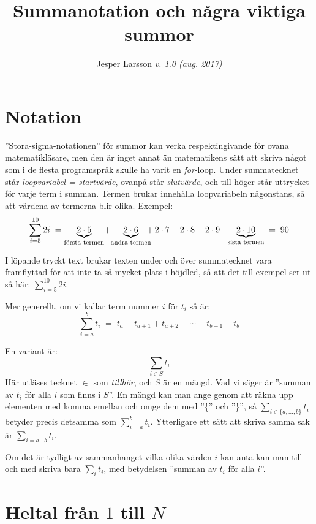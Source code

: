 \documentclass[a4paper]{article}
\author{Jesper Larsson \hspace*{.5em} \emph{v. 1.0 (aug. 2017)}}
\date{}
\title{Summanotation och några viktiga summor}
\begin{document}
\maketitle

\section*{Notation}
\label{sec:orgf287084}

”Stora-sigma-notationen” för summor kan verka respektingivande för ovana matematikläsare, men den är inget
annat än matematikens sätt att skriva något som i de flesta programspråk skulle ha
varit en \emph{for}-loop. Under summatecknet står \emph{loopvariabel = startvärde},
ovanpå står \emph{slutvärde}, och till höger står uttrycket för varje term i
summan. Termen brukar innehålla loopvariabeln någonstans, så att värdena av termerna
blir olika. Exempel:
\[\sum_{i=5}^{10} 2i \; = \underbrace{2\cdot5}_{\text{första
termen}}\!+\!\underbrace{2\cdot6}_{\text{andra
termen}} \hspace{-.67em} \mathop+ 2\cdot7+2\cdot8+2\cdot9+\hspace{-.33em}\underbrace{2\cdot10}_{\text{sista termen}} \;
= \; 90\]

I löpande tryckt text brukar texten under och över
summatecknet vara framflyttad för att inte ta så mycket plats i höjdled, så att
det till exempel ser ut så här: \(\sum_{i=5}^{10} 2i\).

Mer generellt, om vi kallar term nummer \(i\) för \(t_i\) så är:
\[\sum_{i=a}^{b} t_i \; = \; t_{a} + t_{a+1} + t_{a+2} + \cdots + t_{b-1} + t_b\]

En variant är: \[\sum_{i \in S} t_i\] Här utläses tecknet \(\in\) som \emph{tillhör},
och \(S\) är en mängd. Vad vi säger är ”summan av \(t_i\) för alla \(i\) som finns i
\(S\)”. En mängd kan man ange genom att räkna upp elementen med komma emellan och
omge dem med ”\{” och ”\}”, så \(\sum_{i\in\{a, \ldots, b\}} t_i\) betyder precis
detsamma som \(\sum_{i=a}^{b} t_i\). Ytterligare ett sätt att skriva samma sak är
\(\sum_{i=a\ldots b} t_i\).

Om det är tydligt av sammanhanget vilka olika värden \(i\) kan anta kan man till
och med skriva bara \(\sum_i t_i\), med betydelsen ”summan av \(t_i\) för alla \(i\)”. 

\section*{Heltal från \(1\) till \(N\)}
\label{sec:org2e96c99}
\end{document}

